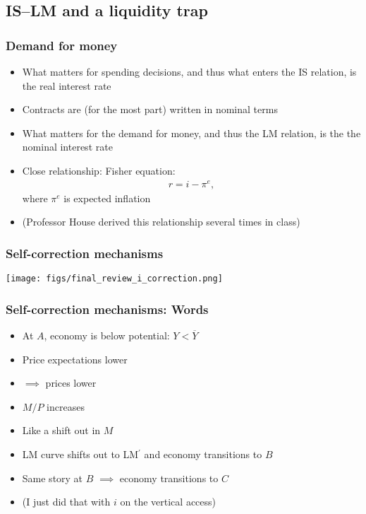 \documentclass[presentation,dvipsnames]{beamer}
\begin{document}
\subsection{IS--LM and a liquidity trap}

\begin{frame}
\frametitle{Demand for money}
\begin{itemize}[label={--}]
\item What matters for spending decisions, and thus what enters the IS relation, is the
\textcolor{RubineRed}{real interest rate}
\item Contracts are (for the most part) written in nominal terms
\item What matters for the demand for money, and thus the LM relation, is the
\textcolor{RubineRed}{the nominal interest rate}
\item Close relationship: \textcolor{RubineRed}{Fisher equation}:
\begin{align*}
r = i - \pi^{e},
\end{align*}
where $\pi^{e}$ is expected inflation
\item (Professor House derived this relationship several times in class)
\end{itemize}
\end{frame}

\begin{frame}
\frametitle{Self-correction mechanisms}
\centerline{\texttt{[image: figs/final\_review\_i\_correction.png]}}
\end{frame}

\begin{frame}
\frametitle{Self-correction mechanisms: Words}
\begin{itemize}[label={--}]
\item At $A$, economy is below potential: $Y < \overline{Y}$
\item Price expectations lower
\item $\implies$ prices lower
\item $M/P$ increases 
\item Like a shift out in $M$
\item LM curve shifts out to LM$^{\prime}$ and economy transitions to $B$
\item Same story at $B$ $\implies$ economy transitions to $C$
\item (I just did that with $i$ on the vertical access)
\end{itemize}
\end{frame}
\end{document}
